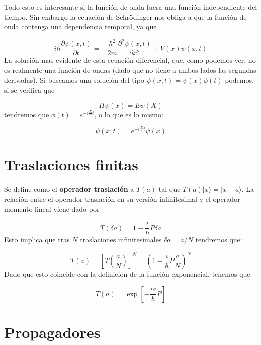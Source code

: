 \documentclass[12pt]{book}
\numberwithin{equation}{chapter}
\numberwithin{figure}{chapter}
\newcommand{\parentesis}[1]{\left( #1  \right)}
\newcommand{\parciales}[2]{\frac{\partial #1}{\partial #2}}
\newcommand{\ccorchetes}[1]{\left[ #1  \right]}
\begin{document}
Todo esto es interesante si la función de onda fuera una función independiente del tiempo. Sin embargo la ecuación de Schrödinger nos obliga a que la función de onda contenga una dependencia temporal, ya que

\begin{equation}
i \hbar \parciales{\psi (x,t)}{t} = -\frac{\hbar^2}{2m} \parciales{^2\psi (x,t)}{x^2} + V(x) \psi (x,t)
\end{equation}
La solución mas evidente de esta ecuación diferencial, que, como podemos ver, no es realmente una función de ondas (dado que no tiene a ambos lados las segundas derivadas). Si buscamos una solución del tipo $\psi(x,t) = \psi(x) \phi (t)$ podemos, si se verifica que

\begin{equation}
H \psi (x) = E \psi (X)
\end{equation}
tendremos que $\phi(t)=e^{-i\frac{E}{\hbar}t}$, o lo que es lo mismo:

\begin{equation}
\psi(x,t) = e^{- i \frac{E}{\hbar} t} \psi(x)
\end{equation}

\section{Traslaciones finitas}

Se define como el \textbf{operador traslación} a $T(a)$ tal que $T(a)|x\rangle = |x+a\rangle$. La relación entre el operador traslación en su versión infinitesimal y el operador momento lineal viene dado por

\begin{equation}
T(\delta a) = 1 - \frac{i}{\hbar} P \delta a
\end{equation}
Esto implica que tras $N$ traslaciones infinitesimales $\delta a=a/N$ tendremos que:

\begin{equation}
T(a) = \ccorchetes{T\parentesis{\frac{a}{N}}}^N = \parentesis{1- \frac{i}{\hbar} P \frac{a}{N}}^N 
\end{equation}
Dado que esto coincide con la definición de la función exponencial, tenemos que

\begin{equation}
T(a) = \exp \ccorchetes{- \frac{ia}{\hbar}P}
\end{equation}

\section{Propagadores}
\end{document}
